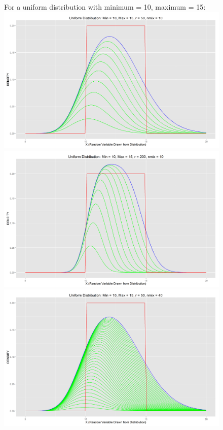 \documentclass[letter]{article}
\begin{document}
\begin{figure}[H]
\centering
\newpage
\Large{For a uniform distribution with minimum = 10, maximum = 15:}\\
\includegraphics[scale=.27]{unifdist_10_15_50_10.png}
\includegraphics[scale=.27]{unifdist_10_15_200_10.png}\\
\includegraphics[scale=.27]{unifdist_10_15_50_40.png}

\end{figure}
\end{document}
